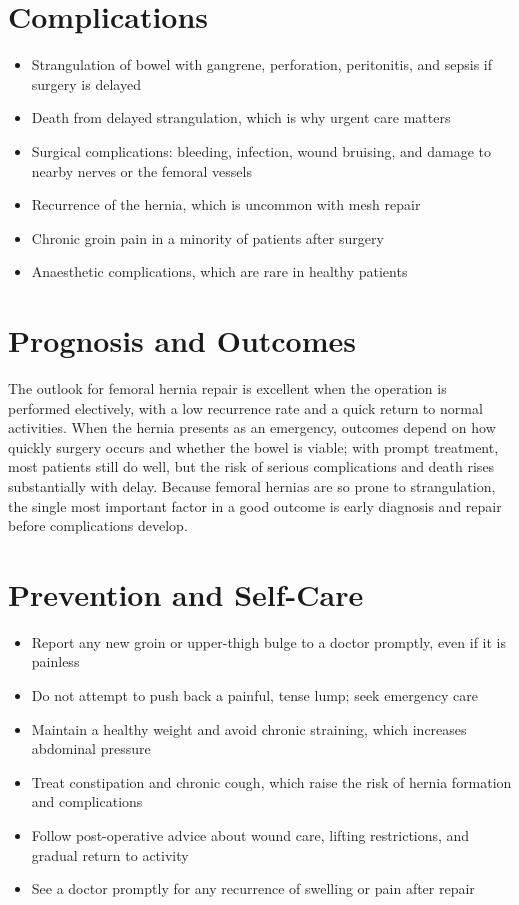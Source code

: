 \section*{Complications}
\begin{itemize}
    \item Strangulation of bowel with gangrene, perforation, peritonitis, and sepsis if surgery is delayed
    \item Death from delayed strangulation, which is why urgent care matters
    \item Surgical complications: bleeding, infection, wound bruising, and damage to nearby nerves or the femoral vessels
    \item Recurrence of the hernia, which is uncommon with mesh repair
    \item Chronic groin pain in a minority of patients after surgery
    \item Anaesthetic complications, which are rare in healthy patients
\end{itemize}

\section*{Prognosis and Outcomes}
The outlook for femoral hernia repair is excellent when the operation is performed electively, with a low recurrence rate and a quick return to normal activities. When the hernia presents as an emergency, outcomes depend on how quickly surgery occurs and whether the bowel is viable; with prompt treatment, most patients still do well, but the risk of serious complications and death rises substantially with delay. Because femoral hernias are so prone to strangulation, the single most important factor in a good outcome is early diagnosis and repair before complications develop.

\section*{Prevention and Self-Care}
\begin{itemize}
    \item Report any new groin or upper-thigh bulge to a doctor promptly, even if it is painless
    \item Do not attempt to push back a painful, tense lump; seek emergency care
    \item Maintain a healthy weight and avoid chronic straining, which increases abdominal pressure
    \item Treat constipation and chronic cough, which raise the risk of hernia formation and complications
    \item Follow post-operative advice about wound care, lifting restrictions, and gradual return to activity
    \item See a doctor promptly for any recurrence of swelling or pain after repair
\end{itemize}


